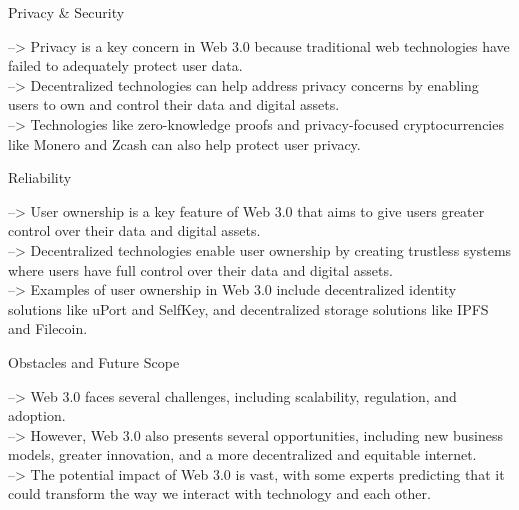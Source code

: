 \documentclass{beamer}
\begin{document}
\begin{frame}{Privacy \& Security}
\begin{block}{}
--> \hspace{3mm}Privacy is a key concern in Web 3.0 because traditional web technologies have failed to adequately protect user data.\break\\
--> \hspace{3mm}Decentralized technologies can help address privacy concerns by enabling users to own and control their data and digital assets.\break\\
--> \hspace{3mm}Technologies like zero-knowledge proofs and privacy-focused cryptocurrencies like Monero and Zcash can also help protect user privacy.
\end{block}
\end{frame}

\begin{frame}{Reliability}
\begin{block}{}
--> \hspace{3mm}User ownership is a key feature of Web 3.0 that aims to give users greater control over their data and digital assets.\break\\
--> \hspace{3mm}Decentralized technologies enable user ownership by creating trustless systems where users have full control over their data and digital assets.\break\\
--> \hspace{3mm}Examples of user ownership in Web 3.0 include decentralized identity solutions like uPort and SelfKey, and decentralized storage solutions like IPFS and Filecoin.
\end{block}
\end{frame}

\begin{frame}{Obstacles and Future Scope}
\begin{block}{}
--> \hspace{3mm}Web 3.0 faces several challenges, including scalability, regulation, and adoption.\break\\
--> \hspace{3mm}However, Web 3.0 also presents several opportunities, including new business models, greater innovation, and a more decentralized and equitable internet.\break\\
--> \hspace{3mm}The potential impact of Web 3.0 is vast, with some experts predicting that it could transform the way we interact with technology and each other.
\end{block}
\end{frame}
\end{document}
